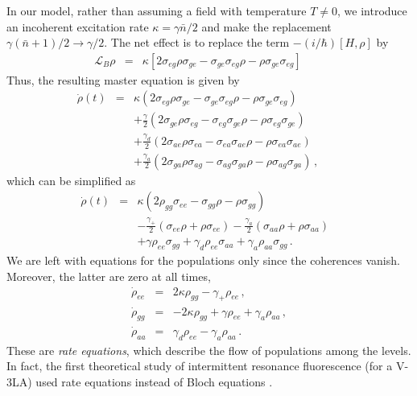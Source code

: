 \documentclass[twocolumn,aps,eqsecnum,showkeys,amsmath]{revtex4-2}
\begin{document}
In our model, rather than assuming a field with temperature $T \neq 0$, 
we introduce an incoherent excitation rate $\kappa = \gamma \bar{n}/2$ 
and make the replacement $\gamma (\bar{n}+1)/2 \to \gamma/2$. The 
net effect is to replace the term $-(i/\hbar) [H,\rho]$ by 
%
\begin{eqnarray}
\mathcal{L}_B \rho &=& \kappa [ 2\sigma_{eg} \rho \sigma_{ge} 
	-\sigma_{ge} \sigma_{eg} \rho -\rho \sigma_{ge} \sigma_{eg} ] 	
	\qquad
\end{eqnarray}
Thus, the resulting master equation is given by
%
\begin{eqnarray}
\dot{\rho}(t) &=&  \kappa (2\sigma_{eg} \rho \sigma_{ge} 
  	-\sigma_{ge} \sigma_{eg} \rho  -\rho \sigma_{ge} \sigma_{eg})     
  	\nonumber \\
&&+\frac{\gamma}{2} (2\sigma_{ge} \rho \sigma_{eg} 
  	-\sigma_{eg} \sigma_{ge} \rho  -\rho \sigma_{eg} \sigma_{ge})     
  	\nonumber \\
&& + \frac{\gamma_d}{2} (2\sigma_{ae} \rho \sigma_{ea} 
  	-\sigma_{ea} \sigma_{ae} \rho -\rho \sigma_{ea} \sigma_{ae}) 	
	\nonumber \\ 
&& +\frac{\gamma_a}{2} (2\sigma_{ga} \rho \sigma_{ag} 
  	-\sigma_{ag} \sigma_{ga} \rho  -\rho \sigma_{ag} \sigma_{ga}) \,, 
	\qquad
\end{eqnarray}
which can be simplified as 
%
\begin{eqnarray}
\dot{\rho}(t) &=& \kappa ( 2 \rho_{gg} \sigma_{ee} -\sigma_{gg} \rho 
	-\rho \sigma_{gg} ) 	\nonumber \\
&& -\frac{\gamma_+}{2} (\sigma_{ee} \rho +\rho \sigma_{ee}) 
    -\frac{\gamma_a}{2} (\sigma_{aa} \rho +\rho \sigma_{aa}) 
        \nonumber \\
&& +\gamma \rho_{ee} \sigma_{gg}  +\gamma_d \rho_{ee} \sigma_{aa}    
    +\gamma_a \rho_{aa} \sigma_{gg}  \,.  \qquad \qquad  
    \label{masterEqInc}
\end{eqnarray}
We are left with equations for the populations only since the coherences 
vanish. Moreover, the latter are zero at all times,  
%
\begin{subequations}
\begin{eqnarray}
\dot{\rho}_{ee} &=& 2\kappa \rho_{gg} -\gamma_+ \rho_{ee} 	\,, \\ 
\dot{\rho}_{gg} &=& -2\kappa \rho_{gg} +\gamma \rho_{ee} 
	+\gamma_a \rho_{aa} 	\,, \\  
\dot{\rho}_{aa} &=& \gamma_d \rho_{ee} -\gamma_a \rho_{aa} 	\,.
\end{eqnarray}
\end{subequations}
These are \textit{rate equations}, which describe the flow of populations 
among the levels. In fact, the first theoretical study of intermittent 
resonance fluorescence (for a V-3LA) used rate equations instead of 
Bloch equations \cite{CoKi86}.  
\end{document}
